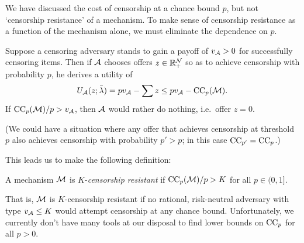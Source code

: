 We have discussed the cost of censorship at a chance bound $p$, but not `censorship resistance' of a mechanism.
%
To make sense of censorship resistance as a function of the mechanism alone, we must eliminate the dependence on $p$.

Suppose a censoring adversary stands to gain a payoff of $v_{\mathcal{A}}>0$ for successfully censoring items.
%
Then if $\mathcal{A}$ chooses offers $z\in\mathbb{R}_+^{\mathcal{N}}$ so as to achieve censorship with probability $p$, he derives a utility of
%
\[
  U_{\mathcal{A}}(z;\bar{\lambda}) = pv_{\mathcal{A}} - \sum z \leq pv_{\mathcal{A}} - \mathrm{CC}_{p}(\mathcal{M}).
\]
%
If $\mathrm{CC}_{p}(\mathcal{M})/p > v_{\mathcal{A}}$, then $\mathcal{A}$ would rather do nothing, i.e.~offer $z=0$.

(We could have a situation where any offer that achieves censorship at threshold $p$ also achieves censorship with probability $p'>p$; in this case $\mathrm{CC}_{p'}=\mathrm{CC}_{p}$.)

This leads us to make the following definition:
%
\begin{definition}

  A mechanism $\mathcal{M}$ is $K$-\emph{censorship resistant} if $\mathrm{CC}_{p}(\mathcal{M})/p>K$ for all $p\in(0,1]$.

\end{definition}
%
That is, $\mathcal{M}$ is $K$-censorship resistant if no rational, risk-neutral adversary with type $v_{\mathcal{A}}\leq K$ would attempt censorship at any chance bound.
%
Unfortunately, we currently don't have many tools at our disposal to find lower bounds on $\mathrm{CC}_{p}$ for all $p>0$.

\begin{comment}
\begin{example}

  Let $\Mechanism$ be the second price auction with $F_{\tilde\theta}$ concave for $\theta\geq Q_{\tilde\theta}(p_0)$.
  Then $\CC{p} \geq N(\tau + Q_{-\tilde\theta}(p^{1/N})p^{\frac{N-1}{N}})$, and so
  \[
    \CC{p}/p \geq N(\tau/p + Q_{-\tilde\theta}(p^{1/N})/p^{1/N})
  \]
  for $p\geq p_0$.
  If $Q_{-\tilde\theta}$ drops off sharply as $p$ goes below $1$, then this function may be minimised at $p<1$.

\end{example}
\end{comment}

